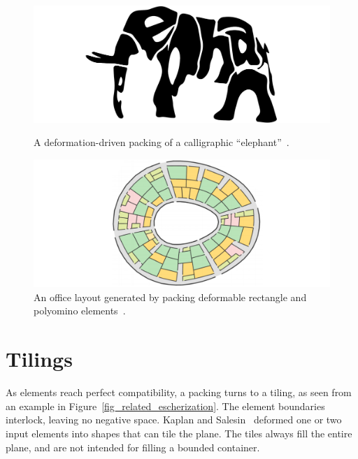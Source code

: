 \begin{figure}
\centering
\includegraphics[width=1.0\textwidth]{figures/related/calligraphy.pdf} 
\caption[A calligraphy packing of an ``elephant'']
{\label{fig_calligraphy_packing} 
\newtext
{
A deformation-driven packing of a calligraphic ``elephant''~\cite{Xu2007}.
}
}
\includegraphics[width=1.0\textwidth]{figures/related/layout.pdf} 
\caption[An office layout generated by packing deformable rectangle and polyomino elements]
{\label{fig_office}
\nnewtext
{
An office layout generated by packing deformable rectangle and polyomino elements~\cite{Peng2014}.
}
}
\end{figure}




\section{Tilings}

\newtext
{
As elements reach perfect compatibility, a packing turns to a tiling, as seen from an example in Figure~\ref{fig_related_escherization}.
The element boundaries interlock, leaving no negative space.
Kaplan and Salesin~\cite{Kaplan2000, Kaplan2004} deformed one or two 
input elements into shapes that can tile the plane.
The tiles always fill the entire plane, and are not intended for filling a bounded container.}


